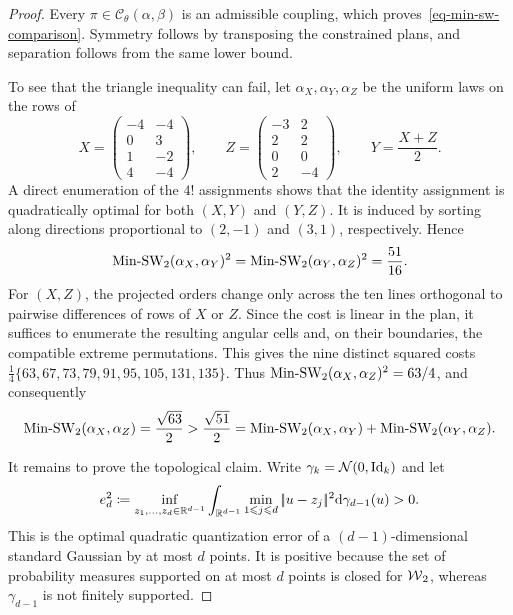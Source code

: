 \begin{proof}
	Every $\pi\in\mathcal C_\theta(\alpha,\beta)$ is an admissible coupling, which proves~\eqref{eq-min-sw-comparison}. Symmetry follows by transposing the constrained plans, and separation follows from the same lower bound.

	To see that the triangle inequality can fail, let $\alpha_X,\alpha_Y,\alpha_Z$ be the uniform laws on the rows of
	\[
		X=\begin{pmatrix}-4&-4\\0&3\\1&-2\\4&-4\end{pmatrix},
		\qquad
		Z=\begin{pmatrix}-3&2\\2&2\\0&0\\2&-4\end{pmatrix},
		\qquad
		Y=\frac{X+Z}{2}.
	\]
	A direct enumeration of the $4!$ assignments shows that the identity assignment is quadratically optimal for both $(X,Y)$ and $(Y,Z)$. It is induced by sorting along directions proportional to $(2,-1)$ and $(3,1)$, respectively. Hence
	\[
		\operatorname{Min\text{-}SW}_2(\alpha_X,\alpha_Y)^2
		=
		\operatorname{Min\text{-}SW}_2(\alpha_Y,\alpha_Z)^2
		=\frac{51}{16}.
	\]
	For $(X,Z)$, the projected orders change only across the ten lines orthogonal to pairwise differences of rows of $X$ or $Z$. Since the cost is linear in the plan, it suffices to enumerate the resulting angular cells and, on their boundaries, the compatible extreme permutations. This gives the nine distinct squared costs
	\(\frac14\{63,67,73,79,91,95,105,131,135\}\).
	Thus $\operatorname{Min\text{-}SW}_2(\alpha_X,\alpha_Z)^2=63/4$, and consequently
	\[
		\operatorname{Min\text{-}SW}_2(\alpha_X,\alpha_Z)=\frac{\sqrt{63}}{2}
		>
		\frac{\sqrt{51}}{2}
		=
		\operatorname{Min\text{-}SW}_2(\alpha_X,\alpha_Y)
		+
		\operatorname{Min\text{-}SW}_2(\alpha_Y,\alpha_Z).
	\]

	It remains to prove the topological claim. Write $\gamma_k=\mathcal{N}(0,\mathrm{Id}_k)$ and let
	\begin{equation}\label{eq-min-sw-quantization-obstruction}
		e_d^2
		\coloneqq
		\inf_{z_1,\ldots,z_d\in\mathbb{R}^{d-1}}
		\int_{\mathbb{R}^{d-1}}
		\min_{1\leqslant j\leqslant d}|\!| u-z_j |\!|^2
		\mathrm{d}\gamma_{d-1}(u)>0.
	\end{equation}
	This is the optimal quadratic quantization error of a $(d-1)$-dimensional standard Gaussian by at most $d$ points. It is positive because the set of probability measures supported on at most $d$ points is closed for $\operatorname{\mathcal{W}}_2$, whereas $\gamma_{d-1}$ is not finitely supported.


\end{proof}
